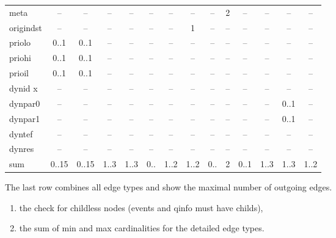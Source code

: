 \begin{table}
\begin{adjustwidth}{-15mm}{}
\begin{tabular}[t]{|l|c|c|c|c|c|c|c|c|c|c|c|c|c|}
meta             & --         & --              & --        & --         & --           & --        & --          & --        & 2          & --               & --          & --        & --        \\
origindst        & --         & --              & --        & --         & --           & --        & 1           & --        & --         & --               & --          & --        & --        \\
priolo           & 0..1       & 0..1            & --        & --         & --           & --        & --          & --        & --         & --               & --          & --        & --        \\
priohi           & 0..1       & 0..1            & --        & --         & --           & --        & --          & --        & --         & --               & --          & --        & --        \\
prioil           & 0..1       & 0..1            & --        & --         & --           & --        & --          & --        & --         & --               & --          & --        & --        \\
dynid x          & --         & --              & --        & --         & --           & --        & --          & --        & --         & --               & --          & --        & --        \\
dynpar0          & --         & --              & --        & --         & --           & --        & --          & --        & --         & --               & --          & 0..1      & --        \\
dynpar1          & --         & --              & --        & --         & --           & --        & --          & --        & --         & --               & --          & 0..1      & --        \\
dyntef           & --         & --              & --        & --         & --           & --        & --          & --        & --         & --               & --          & --        & --        \\
dynres           & --         & --              & --        & --         & --           & --        & --          & --        & --         & --               & --          & --        & --        \\
\hline
sum              & 0..15      & 0..15           & 1..3      & 1..3       & 0..          & 1..2      & 1..2        & 0..       & 2          & 0..1             & 1..3        & 1..3      & 1..2      \\
\hline
\end{tabular}
\end{adjustwidth}
\end{table}
The last row combines all edge types and show the maximal number of outgoing edges.
\begin{enumerate}
\item the check for childless nodes (events and qinfo must have childs),
\item the sum of min and max cardinalities for the detailed edge types.
\end{enumerate}

